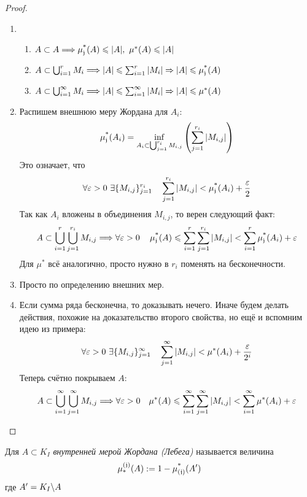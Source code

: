 \begin{proof}~
	\begin{enumerate}
		\item \begin{enumerate}
			\item \(A \subset A \Longrightarrow \operatorname{\mu^*_\mathfrak{j}}(A) \leqslant |A|,\ \mu^*(A) \leqslant |A|\)
			
			\item \(A \subset \bigcup_{i = 1}^r M_i \Longrightarrow |A| \leqslant \sum_{i = 1}^r |M_i| \Rightarrow |A| \leqslant \operatorname{\mu^*_\mathfrak{j}}(A)\)
			
			\item \(A \subset \bigcup_{i = 1}^\infty M_i \Longrightarrow |A| \leqslant \sum_{i = 1}^\infty |M_i| \Rightarrow |A| \leqslant \mu^*(A)\)
		\end{enumerate}
	
		\item Распишем внешнюю меру Жордана для $A_i$:
		\[
			\operatorname{\mu^*_\mathfrak{j}}(A_i) = \inf_{A_i \subset \bigcup_{j = 1}^{r_i} M_{i, j}} \left(\sum\limits_{j = 1}^{r_i} |M_{i, j}|\right)
		\]
		Это означает, что
		\[
			\forall \eps > 0\ \exists \{M_{i, j}\}_{j = 1}^{r_i} \quad \suml_{j = 1}^{r_i} |M_{i, j}| < \upjm(A_i) + \frac{\eps}{2}
		\]
		Так как $A_i$ вложены в объединения $M_{i, j}$, то верен следующий факт:
		\[
			A \subset \bigcup_{i = 1}^r \bigcup_{j = 1}^{r_i} M_{i, j} \Longrightarrow \forall \varepsilon > 0 \quad  \operatorname{\mu^*_\mathfrak{j}}(A) \leqslant \sum\limits_{i = 1}^r \sum\limits_{j = 1}^{r_i} |M_{i, j}| < \sum\limits_{i = 1}^r \operatorname{\mu^*_\mathfrak{j}}(A_i) + \varepsilon
		\]
		Для $\mu^*$ всё аналогично, просто нужно в $r_i$ поменять на бесконечности.
		
		\item Просто по определению внешних мер.
		
		\item Если сумма ряда бесконечна, то доказывать нечего. Иначе будем делать действия, похожие на доказательство второго свойства, но ещё и вспомним идею из примера:
		\[
			\forall \varepsilon > 0\ \exists \{M_{i, j}\}_{j = 1}^\infty \quad \sum\limits_{j = 1}^\infty |M_{i, j}| < \mu^*(A_i) + \frac{\varepsilon}{2^i}
		\]
		Теперь счётно покрываем $A$:
		\[
			A \subset \bigcup_{i = 1}^\infty \bigcup_{j = 1}^\infty M_{i, j} \Longrightarrow \forall \varepsilon > 0 \quad \mu^*(A) \leqslant \sum\limits_{i = 1}^\infty \sum\limits_{j = 1}^\infty |M_{i, j}| < \sum\limits_{i = 1}^\infty \mu^*(A_i) + \varepsilon
		\]
	\end{enumerate}
\end{proof}

\begin{definition}
	Для $A \subset K_I$ \textit{внутренней мерой Жордана (Лебега)} называется величина
	\[
		\operatorname{\mu^{(\mathfrak{j})}_*}(A) := 1 - \operatorname{\mu^*_{(\mathfrak{j})}}(A')
	\]
	где $A' = K_I \backslash A$
\end{definition}

